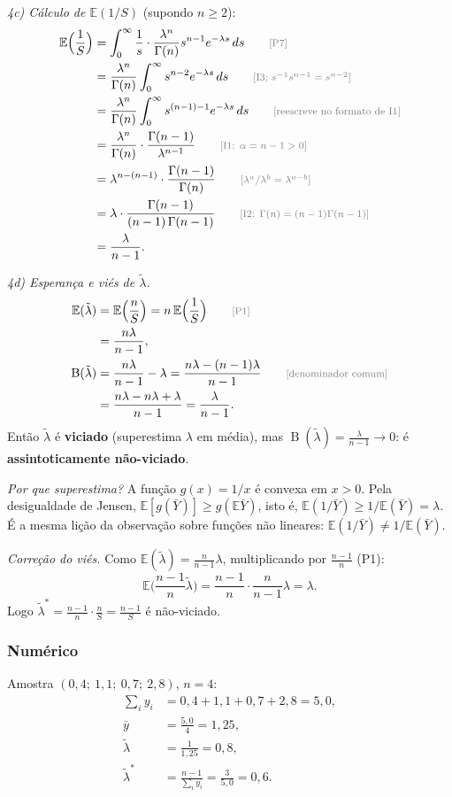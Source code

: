 \documentclass[11pt,a4paper]{article}
\theoremstyle{definition}
\theoremstyle{plain}
\newcommand{\E}{\mathbb{E}}
\newcommand{\B}{\operatorname{B}}
\newcommand{\bY}{\bar{Y}}
\newcommand{\just}[1]{\tag*{\footnotesize\textcolor{gray}{[#1]}}}
\begin{document}
\textit{4c) Cálculo de $\E(1/S)$} (supondo $n\ge2$):
\begin{align*}
\E\Big(\frac1S\Big)&=\int_0^\infty\frac1s\cdot\frac{\lambda^n}{\Gamma(n)}s^{n-1}e^{-\lambda s}\,ds \just{P7}\\
&=\frac{\lambda^n}{\Gamma(n)}\int_0^\infty s^{n-2}e^{-\lambda s}\,ds \just{I3; $s^{-1}s^{n-1}=s^{n-2}$}\\
&=\frac{\lambda^n}{\Gamma(n)}\int_0^\infty s^{(n-1)-1}e^{-\lambda s}\,ds \just{reescreve no formato de I1}\\
&=\frac{\lambda^n}{\Gamma(n)}\cdot\frac{\Gamma(n-1)}{\lambda^{n-1}} \just{I1: $\alpha=n-1>0$}\\
&=\lambda^{n-(n-1)}\cdot\frac{\Gamma(n-1)}{\Gamma(n)} \just{$\lambda^a/\lambda^b=\lambda^{a-b}$}\\
&=\lambda\cdot\frac{\Gamma(n-1)}{(n-1)\,\Gamma(n-1)} \just{I2: $\Gamma(n)=(n-1)\Gamma(n-1)$}\\
&=\frac{\lambda}{n-1}.
\end{align*}

\textit{4d) Esperança e viés de $\tilde\lambda$.}
\begin{align*}
\E(\tilde\lambda)&=\E\Big(\frac nS\Big)=n\,\E\Big(\frac1S\Big) \just{P1}\\
&=\frac{n\lambda}{n-1},\\
\B(\tilde\lambda)&=\frac{n\lambda}{n-1}-\lambda=\frac{n\lambda-(n-1)\lambda}{n-1} \just{denominador comum}\\
&=\frac{n\lambda-n\lambda+\lambda}{n-1}=\frac{\lambda}{n-1}.
\end{align*}
Então $\tilde\lambda$ é \textbf{viciado} (superestima $\lambda$ em média), mas $\B(\tilde\lambda)=\frac{\lambda}{n-1}\to0$: é \textbf{assintoticamente não-viciado}.

\textit{Por que superestima?} A função $g(x)=1/x$ é convexa em $x>0$. Pela desigualdade de Jensen, $\E[g(\bY)]\ge g(\E\bY)$, isto é, $\E(1/\bY)\ge1/\E(\bY)=\lambda$. É a mesma lição da observação sobre funções não lineares: $\E(1/\bY)\neq1/\E(\bY)$.

\textit{Correção do viés.} Como $\E(\tilde\lambda)=\frac{n}{n-1}\lambda$, multiplicando por $\frac{n-1}{n}$ (P1):
\[
\E\Big(\frac{n-1}{n}\tilde\lambda\Big)=\frac{n-1}{n}\cdot\frac{n}{n-1}\lambda=\lambda .
\]
Logo $\tilde\lambda^*=\frac{n-1}{n}\cdot\frac nS=\frac{n-1}{S}$ é não-viciado.

\subsubsection*{Numérico}
Amostra $(0{,}4;\ 1{,}1;\ 0{,}7;\ 2{,}8)$, $n=4$:
\begin{align*}
\sum_iy_i&=0{,}4+1{,}1+0{,}7+2{,}8=5{,}0,\\
\bar y&=\frac{5{,}0}{4}=1{,}25,\\
\tilde\lambda&=\frac1{1{,}25}=0{,}8,\\
\tilde\lambda^*&=\frac{n-1}{\sum_iy_i}=\frac{3}{5{,}0}=0{,}6 .
\end{align*}
\end{document}
